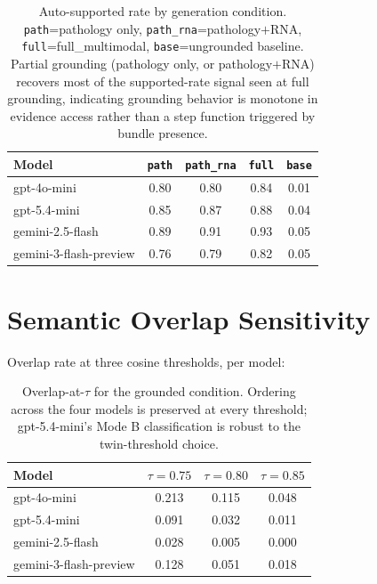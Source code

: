 \documentclass[11pt]{article}
\begin{document}
\begin{table}[h]
\centering
\small
\setlength{\tabcolsep}{3pt}
\begin{tabular}{lcccc}
\toprule
\textbf{Model} & \texttt{path} & \texttt{path\_rna} & \texttt{full} & \texttt{base} \\
\midrule
gpt-4o-mini             & 0.80 & 0.80 & 0.84 & 0.01 \\
gpt-5.4-mini            & 0.85 & 0.87 & 0.88 & 0.04 \\
gemini-2.5-flash        & 0.89 & 0.91 & 0.93 & 0.05 \\
gemini-3-flash-preview  & 0.76 & 0.79 & 0.82 & 0.05 \\
\bottomrule
\end{tabular}
\caption{Auto-supported rate by generation condition. \texttt{path}=pathology only, \texttt{path\_rna}=pathology$+$RNA, \texttt{full}=full\_multimodal, \texttt{base}=ungrounded baseline. Partial grounding (pathology only, or pathology$+$RNA) recovers most of the supported-rate signal seen at full grounding, indicating grounding behavior is monotone in evidence access rather than a step function triggered by bundle presence.}
\label{tab:gradient}
\end{table}

\section{Semantic Overlap Sensitivity}
\label{app:overlap-tau}

Overlap rate at three cosine thresholds, per model:

\begin{table}[h]
\centering
\small
\begin{tabular}{lccc}
\toprule
\textbf{Model} & $\tau{=}0.75$ & $\tau{=}0.80$ & $\tau{=}0.85$ \\
\midrule
gpt-4o-mini             & 0.213 & 0.115 & 0.048 \\
gpt-5.4-mini            & 0.091 & 0.032 & 0.011 \\
gemini-2.5-flash        & 0.028 & 0.005 & 0.000 \\
gemini-3-flash-preview  & 0.128 & 0.051 & 0.018 \\
\bottomrule
\end{tabular}
\caption{Overlap-at-$\tau$ for the grounded condition. Ordering across the four models is preserved at every threshold; gpt-5.4-mini's Mode B classification is robust to the twin-threshold choice.}
\label{tab:tau-sens}
\end{table}
\end{document}
